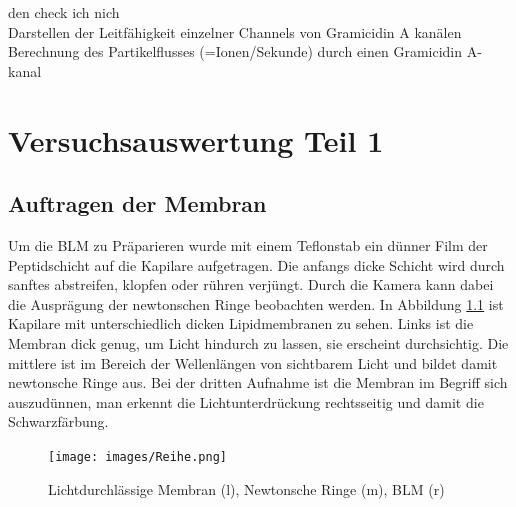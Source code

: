 \documentclass{include/thesisclass3}
\begin{document}
den check ich nich\\

Darstellen der Leitfähigkeit einzelner Channels von Gramicidin A kanälen\\

Berechnung des Partikelflusses (=Ionen/Sekunde) durch einen Gramicidin A-kanal



\chapter{Versuchsauswertung Teil 1}
\section{Auftragen der Membran}
Um die BLM zu Präparieren wurde mit einem Teflonstab ein dünner Film der Peptidschicht auf die Kapilare aufgetragen. Die anfangs dicke Schicht wird durch sanftes abstreifen, klopfen oder rühren verjüngt. Durch die Kamera kann dabei die Ausprägung der newtonschen Ringe beobachten werden. In Abbildung \ref{Reihe} ist Kapilare mit unterschiedlich dicken Lipidmembranen zu sehen. Links ist die Membran dick genug, um Licht hindurch zu lassen, sie erscheint durchsichtig. Die mittlere ist im Bereich der Wellenlängen von sichtbarem Licht und bildet damit newtonsche Ringe aus. Bei der dritten Aufnahme ist die Membran im Begriff sich auszudünnen, man erkennt die Lichtunterdrückung rechtsseitig und damit die Schwarzfärbung.
\begin{figure}[H]
	\begin{center}
		\texttt{[image: images/Reihe.png]}
		\caption{Lichtdurchlässige Membran (l), Newtonsche Ringe (m), BLM (r)}
		\label{Reihe}
	\end{center}
\end{figure}
\end{document}
